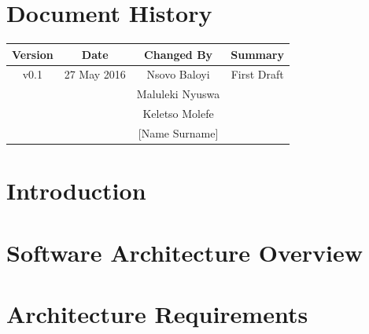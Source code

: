 \documentclass[a4paper,12pt]{article}
\begin{document}
	\newpage
	
	\tableofcontents
	\newpage
	\section*{Document History}
	
	\begin{table}[h!]
		
		\centering %
		\begin{tabular}{c c c c} %
			\hline\hline %
			Version & Date & Changed By & Summary \\ [0.5ex] %
			\hline %
			v0.1 & 27 May 2016 & Nsovo Baloyi & First Draft 
			\\ & & Maluleki Nyuswa &  
			\\ & & Keletso Molefe &
			\\ & & [Name Surname] & \\ [1ex] 
			\hline
		\end{tabular}
		\label{table:nonlin} %
	\end{table}

	\newpage
	
	\section{Introduction}	
	
	
	
	\section{Software Architecture Overview}
	
	
	\section{Architecture Requirements}
	
	
\end{document}
